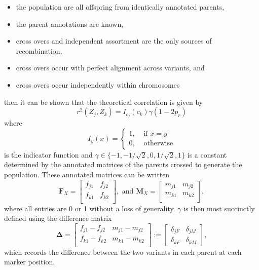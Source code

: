 \documentclass{article}
\newcommand{\m}[1]{\mathbf{#1}}               %
\newcommand{\sm}[1]{\boldsymbol{#1}}   %
\newcommand{\ind}[2]{I_{#2} \left( #1 \right)}
\newcommand{\corr}{r^2}
\begin{document}
\begin{itemize}
\item the population are all offspring from identically annotated parents,
\item the parent annotations are known,
\item cross overs and independent assortment are the only sources of recombination,
\item cross overs occur with perfect alignment across variants, and
\item cross overs occur independently within chromosomes
\end{itemize}
then it can be shown that the theoretical correlation is given by
\begin{equation} \label{eq:prGenCorr}
  \corr(Z_j, Z_k) = \ind{c_k}{c_j} \gamma ( 1 - 2p_r )
\end{equation}
where
\begin{equation*}\ind{x}{y} = \begin{cases}
  1, & \text{ if } x = y \\
  0, & \text{ otherwise}
\end{cases}
\end{equation*}
is the indicator function and $\gamma \in \{-1, -1/\sqrt{2}, 0, 1/\sqrt{2}, 1\}$ is a constant determined by the annotated matrices of the parents crossed to generate the population. These annotated matrices can be written
$$\m{F}_X = \begin{bmatrix}
  f_{j1} & f_{j2} \\
  f_{k1} & f_{k2} \\
\end{bmatrix}, \text{ and }
\m{M}_X = \begin{bmatrix}
  m_{j1} & m_{j2} \\
  m_{k1} & m_{k2} \\
\end{bmatrix},$$
where all entries are 0 or 1 without a loss of generality. $\gamma$ is then most succinctly defined using the difference matrix
\begin{equation} \label{eq:diffMatrix}
  \sm{\Delta} = \begin{bmatrix}
    f_{j1} - f_{j2} & m_{j1} - m_{j2} \\
    f_{k1} - f_{k2} & m_{k1} - m_{k2} \\
  \end{bmatrix} := \begin{bmatrix}
    \delta_{jF} & \delta_{jM} \\
    \delta_{kF} & \delta_{kM}
  \end{bmatrix},
\end{equation}
which records the difference between the two variants in each parent at each marker position.
\end{document}
